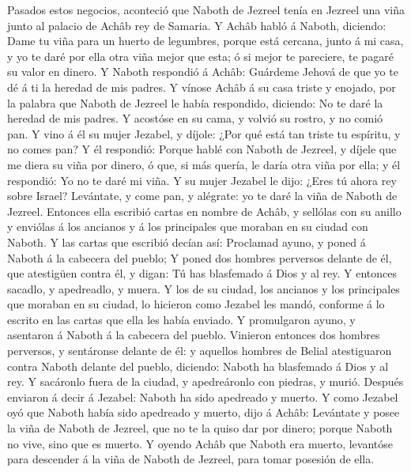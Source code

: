  Pasados estos negocios, aconteció que Naboth de Jezreel
tenía en Jezreel una viña junto al palacio de Achâb rey de Samaria.
 Y Achâb habló á Naboth, diciendo: Dame tu viña para un
huerto de legumbres, porque está cercana, junto á mi casa, y yo te daré
por ella otra viña mejor que esta; ó si mejor te pareciere, te pagaré su
valor en dinero.  Y Naboth respondió á Achâb: Guárdeme
Jehová de que yo te dé á ti la heredad de mis padres.  Y
vínose Achâb á su casa triste y enojado, por la palabra que Naboth de
Jezreel le había respondido, diciendo: No te daré la heredad de mis
padres. Y acostóse en su cama, y volvió su rostro, y no comió pan.
 Y vino á él su mujer Jezabel, y díjole: ¿Por qué está tan
triste tu espíritu, y no comes pan?  Y él respondió: Porque
hablé con Naboth de Jezreel, y díjele que me diera su viña por dinero, ó
que, si más quería, le daría otra viña por ella; y él respondió: Yo no
te daré mi viña.  Y su mujer Jezabel le dijo: ¿Eres tú ahora
rey sobre Israel? Levántate, y come pan, y alégrate: yo te daré la viña
de Naboth de Jezreel.  Entonces ella escribió cartas en
nombre de Achâb, y sellólas con su anillo y enviólas á los ancianos y á
los principales que moraban en su ciudad con Naboth.  Y las
cartas que escribió decían así: Proclamad ayuno, y poned á Naboth á la
cabecera del pueblo;  Y poned dos hombres perversos delante
de él, que atestigüen contra él, y digan: Tú has blasfemado á Dios y al
rey. Y entonces sacadlo, y apedreadlo, y muera.  Y los de
su ciudad, los ancianos y los principales que moraban en su ciudad, lo
hicieron como Jezabel les mandó, conforme á lo escrito en las cartas que
ella les había enviado.  Y promulgaron ayuno, y asentaron á
Naboth á la cabecera del pueblo.  Vinieron entonces dos
hombres perversos, y sentáronse delante de él: y aquellos hombres de
Belial atestiguaron contra Naboth delante del pueblo, diciendo: Naboth
ha blasfemado á Dios y al rey. Y sacáronlo fuera de la ciudad, y
apedreáronlo con piedras, y murió.  Después enviaron á
decir á Jezabel: Naboth ha sido apedreado y muerto.  Y como
Jezabel oyó que Naboth había sido apedreado y muerto, dijo á Achâb:
Levántate y posee la viña de Naboth de Jezreel, que no te la quiso dar
por dinero; porque Naboth no vive, sino que es muerto.  Y
oyendo Achâb que Naboth era muerto, levantóse para descender á la viña
de Naboth de Jezreel, para tomar posesión de ella. 
